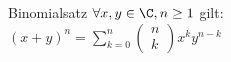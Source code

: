 \begin{theorem}{Binomialsatz}
	$\forall x,y \in \C, n \geq 1$ gilt:
	\\$(x+y)^n = \sum^{n}_{k=0} \begin{pmatrix}n\\k\end{pmatrix} x^k y^{n-k}$\\
\end{theorem}

